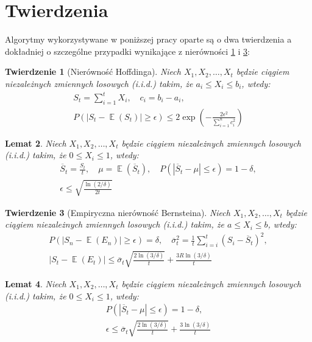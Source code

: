 \documentclass[inzynierska]{pwr_wmat_praca_dyplomowa}
\theoremstyle{plain}
\newtheorem{theorem}{Twierdzenie}
\numberwithin{theorem}{chapter}
\newtheorem{lemma}[theorem]{Lemat}
\theoremstyle{definition}
\numberwithin{theorem}{chapter}
\DeclareMathOperator{\EX}{\mathbb{E}}%
\begin{document}
	\section{Twierdzenia}
	Algorytmy wykorzystywane w poniższej pracy oparte są o dwa twierdzenia a dokładniej o szczególne przypadki wynikające z nierówności \ref{Hoffding ineq} i \ref{Bernsteina emp ineq}:
	\begin{theorem}[Nierówność Hoffdinga]
		\label{Hoffding ineq}
		Niech $X_1,X_2,\dots,X_t$ będzie ciągiem niezależnych zmiennych losowych (i.i.d.) takim, że $a_i \le X_i \le b_i$, wtedy:
		\begin{gather*}
			S_t = \sum_{i=1}^{t} X_i,\quad c_i = b_i - a_i, \\
			P(|S_t - \EX(S_t)| \ge \epsilon ) \le 2\exp\left( -\frac{2\epsilon^2}{\sum_{i=1}^{n} c_i^2} \right)
		\end{gather*}
	\end{theorem}
	\begin{lemma}
		\label{Hoffding ineq lemma}
		Niech $X_1,X_2,\dots,X_t$ będzie ciągiem niezależnych zmiennych losowych (i.i.d.) takim, że $0 \le X_i \le 1$, wtedy:
		\begin{gather*}
			\overline{S}_t = \frac{S_t}{t},\quad 
			\mu = \EX(\overline{S}_t),\quad  	
			P(|\overline{S}_t - \mu | \le \epsilon ) = 1 - \delta, \\
			\epsilon \le  \sqrt{\frac{\ln(2/\delta)}{2t}}   
		\end{gather*}
	\end{lemma}

		\begin{theorem}[Empiryczna nierówność Bernsteina]
		\label{Bernsteina emp ineq}
		Niech $X_1,X_2,\dots,X_t$ będzie ciągiem niezależnych zmiennych losowych (i.i.d.) takim, że $a \le X_i \le b$, wtedy:
		\begin{gather*}
			P(|S_n - \EX(E_n)| \ge \epsilon ) = \delta, \quad \overline \sigma_t^2 = \frac{1}{t}\sum_{i=i}^{t}(S_i - \overline{S}_t)^2, \\
			|S_t - \EX(E_t)| \le \overline{\sigma}_t \sqrt{\frac{2\ln(3/\delta)}{t}} + \frac{3 R \ln{(3 / \delta)}}{t}
		\end{gather*}
	\end{theorem}
	\begin{lemma}\label{Bernsteina emp ineq lemma}
		Niech $X_1,X_2,\dots,X_t$ będzie ciągiem niezależnych zmiennych losowych (i.i.d.) takim, że $0 \le X_i \le 1$, wtedy:
		\begin{gather*}
			P(|\overline{S}_t - \mu | \le \epsilon ) = 1 - \delta,\\
			\epsilon \le \overline{\sigma}_t \sqrt{\frac{2\ln(3/\delta)}{t}} + \frac{3  \ln{(3 / \delta)}}{t}
		\end{gather*}
	\end{lemma}
\end{document}

